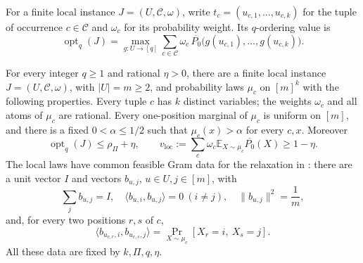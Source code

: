 For a finite local instance \(J=(U,\mathcal C,\omega)\), write
\(t_c=(u_{c,1},\ldots,u_{c,k})\) for the tuple of occurrence
\(c\in\mathcal C\) and \(\omega_c\) for its probability weight.
Its \(q\)-ordering value is
\[
 \operatorname{opt}_q(J)=
 \max_{g:U\to[q]}
 \sum_{c\in\mathcal C}\omega_c\,
 \overline{P_0}\bigl(g(u_{c,1}),\ldots,g(u_{c,k})\bigr).
\]

\begin{lemma}\label{lem:ordering-local-data}
For every integer \(q\ge1\) and rational \(\eta>0\), there are a
finite local instance \(J=(U,\mathcal C,\omega)\), with
\(|U|=m\ge2\), and probability laws \(\mu_c\) on \([m]^k\) with the
following properties.  Every tuple \(c\) has \(k\) distinct variables;
the weights \(\omega_c\) and all atoms of \(\mu_c\) are rational.
Every one-position marginal of \(\mu_c\) is uniform on \([m]\), and
there is a fixed \(0<\alpha\le1/2\) such that
\(\mu_c(x)>\alpha\) for every \(c,x\).  Moreover
\begin{equation}
 \operatorname{opt}_q(J)\le\rho_\Pi+\eta,\qquad
 v_{\mathrm{loc}}:=
 \sum_c\omega_c\mathbb E_{X\sim\mu_c}\overline{P_0}(X)
 \ge1-\eta.
\label{eq:ordering-local-gap}
\end{equation}
The local laws have common feasible Gram data for the relaxation in
\cite[Section~8.3]{GuruswamiEtAl2011OrderingCSP}: there are a unit
vector \(I\) and vectors \(b_{u,j}\), \(u\in U,j\in[m]\), with
\[
 \sum_j b_{u,j}=I,\quad
 \langle b_{u,i},b_{u,j}\rangle=0\ (i\ne j),\quad
 \|b_{u,j}\|^2=\frac1m,
\]
and, for every two positions \(r,s\) of \(c\),
\begin{equation}
 \langle b_{u_{c,r},i},b_{u_{c,s},j}\rangle
 =\Pr_{X\sim\mu_c}[X_r=i,\ X_s=j].
\label{eq:ordering-local-moments}
\end{equation}
All these data are fixed by \(k,\Pi,q,\eta\).
\end{lemma}

